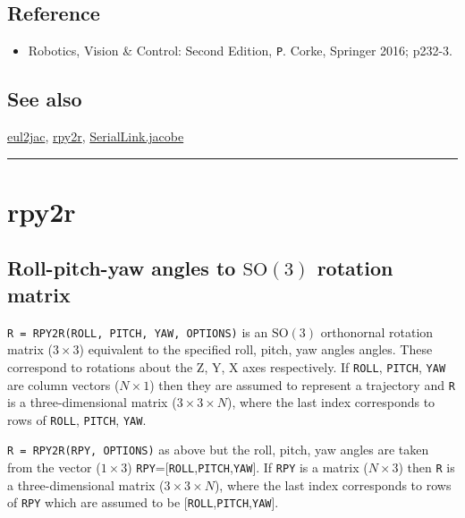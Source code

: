 \subsection*{Reference}
\begin{itemize}
  \item Robotics, Vision \& Control: Second Edition, \texttt{P}. Corke, Springer 2016; p232-3.
\end{itemize}

\subsection*{See also}


\hyperlink{eul2jac}{\color{blue} eul2jac}, \hyperlink{rpy2r}{\color{blue} rpy2r}, \hyperlink{SerialLink.jacobe}{\color{blue} SerialLink.jacobe}

\vspace{1.5ex}\rule{\textwidth}{1mm}

\hypertarget{rpy2r}{\section*{rpy2r}}
\subsection*{Roll-pitch-yaw angles to $\mbox{SO}(3)$ rotation matrix}


\texttt{R = RPY2R(ROLL, PITCH, YAW, OPTIONS)} is an $\mbox{SO}(3)$ orthonornal rotation
matrix ($3 \times 3$) equivalent to the specified roll, pitch, yaw angles angles.
These correspond to rotations about the Z, Y, X axes respectively. If
\texttt{ROLL}, \texttt{PITCH}, \texttt{YAW} are column vectors ($N \times 1$) then they are assumed to
represent a trajectory and \texttt{R} is a three-dimensional matrix ($3 \times 3 \times N$), where
the last index corresponds to rows of \texttt{ROLL}, \texttt{PITCH}, \texttt{YAW}.



\texttt{R = RPY2R(RPY, OPTIONS)} as above but the roll, pitch, yaw angles are
taken from the vector ($1 \times 3$) \texttt{RPY}=[\texttt{ROLL},\texttt{PITCH},\texttt{YAW}]. If \texttt{RPY} is a matrix
($N \times 3$) then \texttt{R} is a three-dimensional matrix ($3 \times 3 \times N$), where the last index
corresponds to rows of \texttt{RPY} which are assumed to be [\texttt{ROLL},\texttt{PITCH},\texttt{YAW}].


